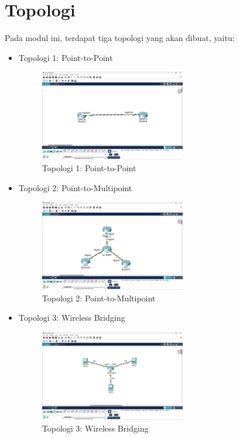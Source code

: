 \section*{Topologi} %

Pada modul ini, terdapat tiga topologi yang akan dibuat, yaitu:

\begin{itemize}
    \item Topologi 1: Point-to-Point
    \begin{figure}[H]
        \centering
        \includegraphics[width=0.6\textwidth]{img/point-point.jpeg}
        \caption{Topologi 1: Point-to-Point}
        \label{fig:topo1}
    \end{figure}
    \item Topologi 2: Point-to-Multipoint
    \begin{figure}[H]
        \centering
        \includegraphics[width=0.6\textwidth]{img/point-multipoint.jpeg}
        \caption{Topologi 2: Point-to-Multipoint}
        \label{fig:topo2}
    \end{figure}
    \item Topologi 3: Wireless Bridging
    \begin{figure}[H]
        \centering
        \includegraphics[width=0.6\textwidth]{img/wireless-bridging.jpeg}
        \caption{Topologi 3: Wireless Bridging}
        \label{fig:topo3}
    \end{figure}
\end{itemize}
